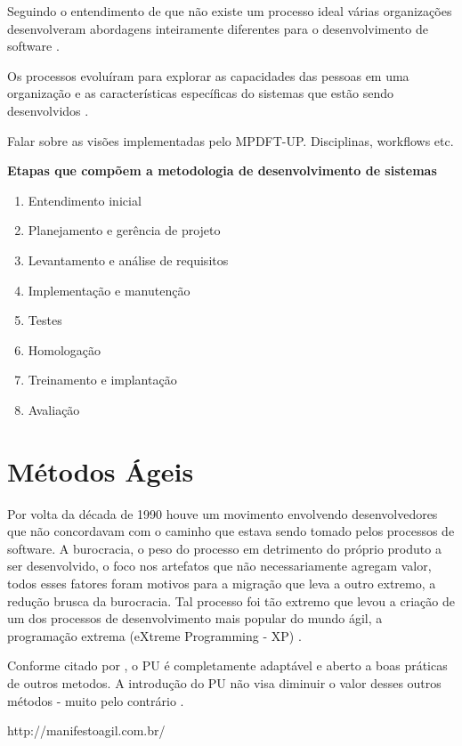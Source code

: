 \documentclass[
	article,			%
	11pt,				%
	oneside,			%
	a4paper,			%
	english,			%
	brazil,				%
	sumario=tradicional
	]{abntex2}
\begin{document}
Seguindo o entendimento de que não existe um processo ideal várias organizações
desenvolveram abordagens inteiramente diferentes para o desenvolvimento de
software \cite{sommerville2007}.

Os processos evoluíram para explorar as capacidades das pessoas em uma
organização e as características específicas do sistemas que estão sendo
desenvolvidos \cite{sommerville2007}.

Falar sobre as visões implementadas pelo MPDFT-UP. Disciplinas, workflows etc.

\textbf{Etapas que compõem a metodologia de desenvolvimento de sistemas}

\begin{enumerate}
   \item Entendimento inicial
   \item Planejamento e gerência de projeto
   \item Levantamento e análise de requisitos
   \item Implementação e manutenção
   \item Testes
   \item Homologação
   \item Treinamento e implantação
   \item Avaliação
\end{enumerate}

\section{Métodos Ágeis}

Por volta da década de 1990 houve um movimento envolvendo desenvolvedores que
não concordavam com o caminho que estava sendo tomado pelos processos de
software. A burocracia, o peso do processo em detrimento do próprio produto a
ser desenvolvido, o foco nos artefatos que não necessariamente agregam valor,
todos esses fatores foram motivos para a migração que leva a outro extremo, a
redução brusca da burocracia. Tal processo foi tão extremo que levou a criação
de um dos processos de desenvolvimento mais popular do mundo ágil, a programação
extrema (eXtreme Programming - XP) \cite{Beck:1999:ECE:619045.621348}.

Conforme citado por , o PU é completamente
adaptável e aberto a boas práticas de outros metodos. A introdução do PU não
visa diminuir o valor desses outros métodos - muito pelo contrário
\cite{larman2007utilizando}.

http://manifestoagil.com.br/ \cite{agilemanifesto}
\end{document}
